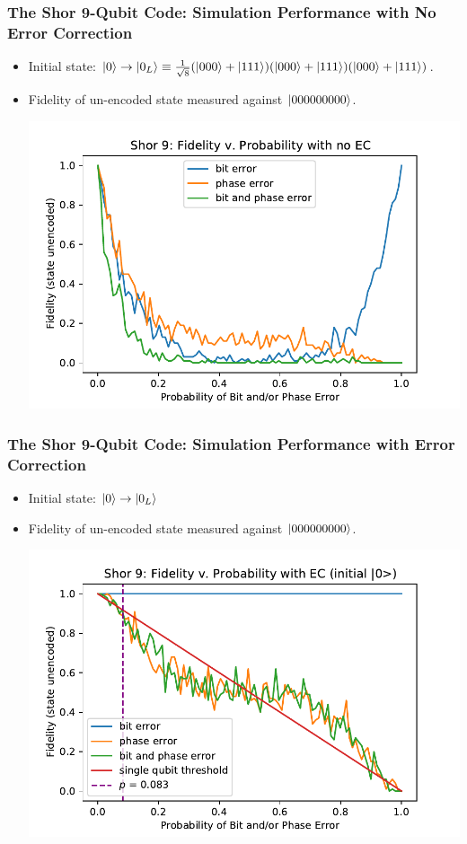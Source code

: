 \documentclass{beamer}
\begin{document}
\begin{frame}
    \frametitle{The Shor 9-Qubit Code: Simulation Performance with No Error Correction}
        \begin{itemize}
            \item Initial state: $\left\vert{0}\right\rangle \rightarrow \left\vert{0_L}\right\rangle \equiv \frac{1}{\sqrt{8}}(\left\vert{000}\right\rangle+\left\vert{111}\right\rangle)(\left\vert{000}\right\rangle+\left\vert{111}\right\rangle)(\left\vert{000}\right\rangle+\left\vert{111}\right\rangle)$.
            \item Fidelity of un-encoded state measured against $\left\vert{000000000}\right\rangle$.
            
            \centering\includegraphics[scale = 0.5]{shor9_nec.pdf}
        \end{itemize}
\end{frame}

\begin{frame}
    \frametitle{The Shor 9-Qubit Code: Simulation Performance with Error Correction}
    \begin{itemize}
        \item Initial state: $\left\vert{0}\right\rangle \rightarrow \left\vert{0_L}\right\rangle$
        \item Fidelity of un-encoded state measured against $\left\vert{000000000}\right\rangle$.
        
        \centering\includegraphics[scale = 0.6]{shor9_ec.pdf}
    \end{itemize}
            
\end{frame}
\end{document}
